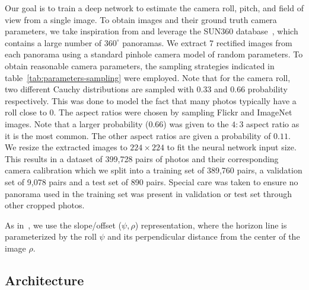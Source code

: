 Our goal is to train a deep network to estimate the camera roll, pitch, and field of view from a single image. To obtain images and their ground truth camera parameters, we take inspiration from \cite{Workman2016,holdgeoffroy-cvpr-17} and leverage the SUN360 database~\cite{Xiao2012}, which contains a large number of $360^\circ$ panoramas. We extract 7 rectified images from each panorama using a standard pinhole camera model of random parameters. To obtain reasonable camera parameters, the sampling strategies indicated in table~\ref{tab:parameters-sampling} were employed. Note that for the camera roll, two different Cauchy distributions are sampled with 0.33 and 0.66 probability respectively. This was done to model the fact that many photos typically have a roll close to 0. The aspect ratios were chosen by sampling Flickr and ImageNet images. Note that a larger probability (0.66) was given to the $4{:}3$ aspect ratio as it is the most common. The other aspect ratios are given a probability of $0.11$. We resize the extracted images to $224\times224$ to fit the neural network input size. This results in a dataset of 399,728 pairs of photos and their corresponding camera calibration which we split into a training set of 389,760 pairs, a validation set of 9,078 pairs and a test set of 890 pairs. Special care was taken to ensure no panorama used in the training set was present in validation or test set through other cropped photos.

As in~\cite{Workman2016}, we use the slope/offset ($\psi,\rho$) representation, where the horizon line is parameterized by the roll $\psi$ and its perpendicular distance from the center of the image $\rho$.

\subsection{Architecture}

